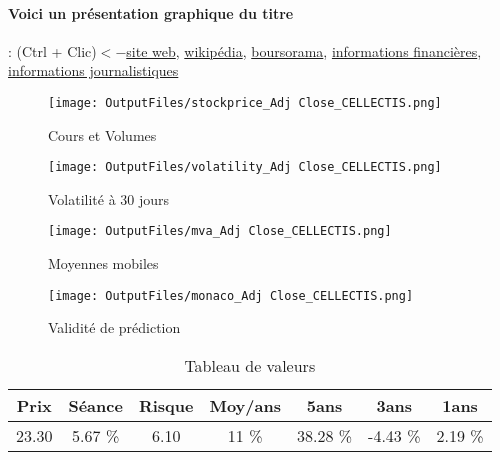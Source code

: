 \documentclass[11pt,a4paper]{report}%
\begin{document}
\paragraph{Voici un présentation graphique du titre} : (Ctrl + Clic)$<-$\href{https://www.cellectis.com/fr/investors}{site web}, \href{https://fr.wikipedia.org/wiki/Cellectis}{wikipédia}, \href{https://www.boursorama.com/cours/1rEPALCLS/}{boursorama}, \href{https://www.qwant.com/?q=site:https:%2f%2fwww.easybourse.com%2faction-societe%2fCELLECTIS&t=web&client=ext-firefox-hp}{informations financières}, \href{https://bourse.lerevenu.com/cours-de-bourse/fiche-valeur-synthese/CELLECTIS/ALCLS-FR}{informations journalistiques}
\begin{figure}[!htb]
   \begin{minipage}{0.5\textwidth}
     \centering
     \texttt{[image: OutputFiles/stockprice\_Adj Close\_CELLECTIS.png]}
     \caption{Cours et Volumes}\label{Fig:price_CELLECTIS}
   \end{minipage}\hfill
   \begin{minipage}{0.5\textwidth}
     \centering
     \texttt{[image: OutputFiles/volatility\_Adj Close\_CELLECTIS.png]}
     \caption{Volatilité à 30 jours}\label{Fig:volat_CELLECTIS}
   \end{minipage}
\end{figure}
\begin{figure}[!htb]
   \begin{minipage}{0.5\textwidth}
     \centering
     \texttt{[image: OutputFiles/mva\_Adj Close\_CELLECTIS.png]}
     \caption{Moyennes mobiles}\label{Fig:mva_CELLECTIS}
   \end{minipage}\hfill
   \begin{minipage}{0.5\textwidth}
     \centering
     \texttt{[image: OutputFiles/monaco\_Adj Close\_CELLECTIS.png]}
     \caption{Validité de prédiction}\label{Fig:prediction_CELLECTIS}
   \end{minipage}
\end{figure}

\begin{table}[H]
  \centering
    \begin{tabular}{|c|c|c|c|c|c|c|}
    \hline
    Prix & Séance & Risque  & Moy/ans & 5ans & 3ans & 1ans \\
    \hline
    23.30 &    5.67 \%    & 6.10 & 11 \% & 38.28 \% & -4.43 \% & 2.19 \% \\
    \hline
    \end{tabular}%
        \label{tab:table_CELLECTIS}%
      \caption{Tableau de valeurs}
\end{table}%
\end{document}
